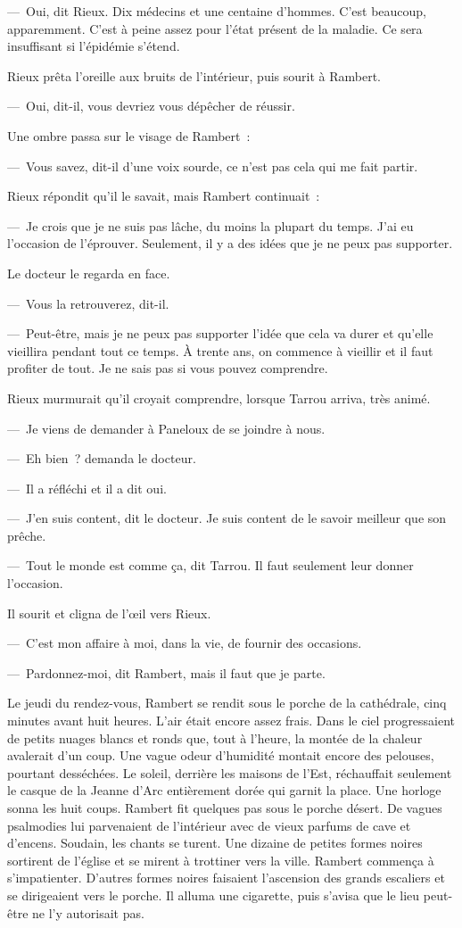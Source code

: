\documentclass[french,twoside]{book} %
\begin{document}
— Oui, dit Rieux. Dix médecins et une centaine d’hommes. C’est beaucoup, apparemment. C’est à peine assez pour l’état présent de la maladie. Ce sera insuffisant si l’épidémie s’étend.\par
Rieux prêta l’oreille aux bruits de l’intérieur, puis sourit à Rambert.\par
— Oui, dit-il, vous devriez vous dépêcher de réussir.\par
Une ombre passa sur le visage de Rambert :\par
— Vous savez, dit-il d’une voix sourde, ce n’est pas cela qui me fait partir.\par
Rieux répondit qu’il le savait, mais Rambert continuait :\par
— Je crois que je ne suis pas lâche, du moins la plupart du temps. J’ai eu l’occasion de l’éprouver. Seulement, il y a des idées que je ne peux pas supporter.\par
Le docteur le regarda en face.\par
— Vous la retrouverez, dit-il.\par
— Peut-être, mais je ne peux pas supporter l’idée que cela va durer et qu’elle vieillira pendant tout ce temps. À trente ans, on commence à vieillir et il faut profiter de tout. Je ne sais pas si vous pouvez comprendre.\par
Rieux murmurait qu’il croyait comprendre, lorsque Tarrou arriva, très animé.\par
— Je viens de demander à Paneloux de se joindre à nous.\par
— Eh bien ? demanda le docteur.\par
— Il a réfléchi et il a dit oui.\par
— J’en suis content, dit le docteur. Je suis content de le savoir meilleur que son prêche.\par
— Tout le monde est comme ça, dit Tarrou. Il faut seulement leur donner l’occasion.\par
Il sourit et cligna de l’œil vers Rieux.\par
— C’est mon affaire à moi, dans la vie, de fournir des occasions.\par
— Pardonnez-moi, dit Rambert, mais il faut que je parte.\par
Le jeudi du rendez-vous, Rambert se rendit sous le porche de la cathédrale, cinq minutes avant huit heures. L’air était encore assez frais. Dans le ciel progressaient de petits nuages blancs et ronds que, tout à l’heure, la montée de la chaleur avalerait d’un coup. Une vague odeur d’humidité montait encore des pelouses, pourtant desséchées. Le soleil, derrière les maisons de l’Est, réchauffait seulement le casque de la Jeanne d’Arc entièrement dorée qui garnit la place. Une horloge sonna les huit coups. Rambert fit quelques pas sous le porche désert. De vagues psalmodies lui parvenaient de l’intérieur avec de vieux parfums de cave et d’encens. Soudain, les chants se turent. Une dizaine de petites formes noires sortirent de l’église et se mirent à trottiner vers la ville. Rambert commença à s’impatienter. D’autres formes noires faisaient l’ascension des grands escaliers et se dirigeaient vers le porche. Il alluma une cigarette, puis s’avisa que le lieu peut-être ne l’y autorisait pas.\par
\end{document}
